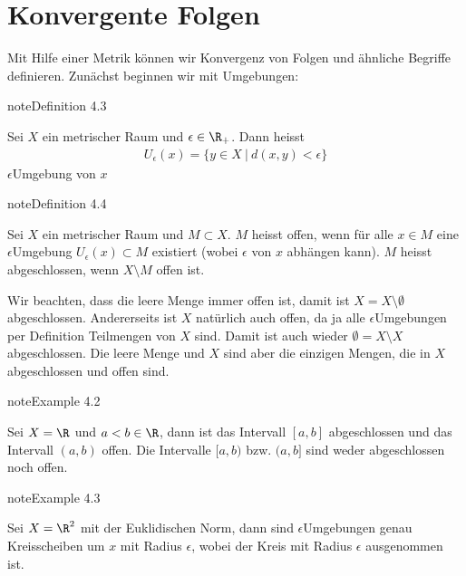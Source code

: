 \documentclass[letterpaper,10pt,english]{jupyterBook}
\begin{document}
\section{Konvergente Folgen}
\label{\detokenize{metrik/konvfolgen:konvergente-folgen}}\label{\detokenize{metrik/konvfolgen::doc}}
Mit Hilfe einer Metrik können wir Konvergenz von Folgen und ähnliche Begriffe definieren. Zunächst beginnen wir mit Umgebungen:
\label{metrik/konvfolgen:definition-0}
\begin{sphinxadmonition}{note}{Definition 4.3}



Sei \(X\) ein metrischer Raum und \(\epsilon \in \R_+\). Dann heisst
\begin{equation*}
\begin{split} U_\epsilon(x) = \{ y \in X~|~d(x,y) < \epsilon \}\end{split}
\end{equation*}
\(\epsilon\)\sphinxhyphen{}Umgebung von \(x\)
\end{sphinxadmonition}
\label{metrik/konvfolgen:definition-1}
\begin{sphinxadmonition}{note}{Definition 4.4}



Sei \(X\) ein metrischer Raum und \(M \subset X\). \(M\) heisst offen, wenn für alle \(x \in M\) eine \(\epsilon\)\sphinxhyphen{}Umgebung \(U_\epsilon(x) \subset M\) existiert (wobei \(\epsilon\) von \(x\) abhängen kann). \(M\) heisst abgeschlossen, wenn \(X \setminus M\) offen ist.
\end{sphinxadmonition}

Wir beachten, dass die leere Menge immer offen ist, damit ist \(X =X \setminus \emptyset\) abgeschlossen. Andererseits ist \(X\) natürlich auch offen, da ja alle \(\epsilon\)\sphinxhyphen{}Umgebungen per Definition Teilmengen von \(X\) sind. Damit ist auch wieder \(\emptyset =  X \setminus X\) abgeschlossen. Die leere Menge und \(X\) sind aber die einzigen Mengen, die in \(X\) abgeschlossen und offen sind.
\label{metrik/konvfolgen:example-2}
\begin{sphinxadmonition}{note}{Example 4.2}



Sei \(X=\R\) und \(a < b \in \R\), dann ist das Intervall \([a,b]\) abgeschlossen und das Intervall \((a,b)\) offen. Die Intervalle \([a,b)\) bzw. \((a,b]\) sind weder abgeschlossen noch offen.
\end{sphinxadmonition}
\label{metrik/konvfolgen:example-3}
\begin{sphinxadmonition}{note}{Example 4.3}



Sei \(X=\R^2\) mit der Euklidischen Norm, dann sind \(\epsilon\)\sphinxhyphen{}Umgebungen genau Kreisscheiben um \(x\) mit Radius \(\epsilon\), wobei der Kreis mit Radius \(\epsilon\) ausgenommen ist.
\end{sphinxadmonition}
\end{document}
